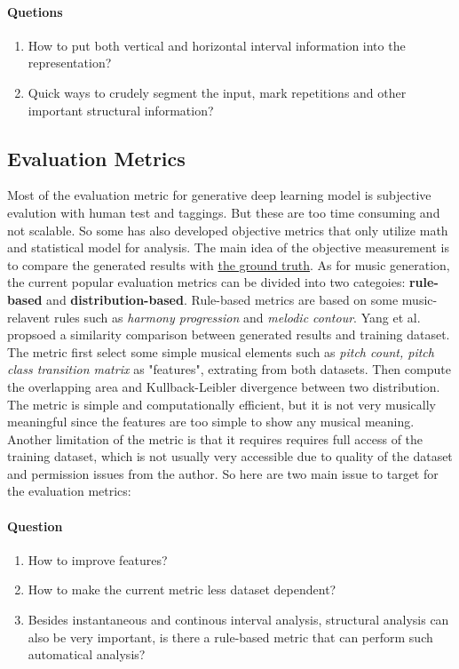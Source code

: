 \documentclass[12pt]{report}
\begin{document}
\paragraph*{Quetions}
\begin{enumerate}
    \item How to put both vertical and horizontal interval information into 
    the representation?
    \item Quick ways to crudely segment the input, mark repetitions and other
    important structural information?
\end{enumerate}
\subsection*{Evaluation Metrics}
Most of the evaluation metric for generative deep learning model is 
subjective evalution with human test and taggings. But these are too
time consuming and not scalable. So some has also developed objective 
metrics that only utilize math and statistical model for analysis.
The main idea of the objective measurement is to compare
the generated results with \href{https://towardsdatascience.com/how-to-evaluate-text-generation-models-metrics-for-automatic-evaluation-of-nlp-models-e1c251b04ec1}
{the ground truth}. As for music generation, the current popular evaluation metrics 
can be divided into two categoies\cite{survey}: \textbf{rule-based} 
and \textbf{distribution-based}. Rule-based metrics are based on
some music-relavent rules such as \textit{harmony progression} and
\textit{melodic contour}. Yang et al.\cite{yang} propsoed a 
similarity comparison between generated results and training dataset.
The metric first select some simple musical elements such as \textit{pitch count, pitch 
class transition matrix} as "features", extrating from both datasets.
Then compute the overlapping area and Kullback-Leibler divergence between
two distribution. The metric is simple and computationally efficient, but
it is not very musically meaningful since the features are too simple to 
show any musical meaning. Another limitation of the metric is that it
requires requires full access of the training dataset, which is not usually
very accessible due to quality of the dataset and permission issues from the
author. So here are two main issue to target for the evaluation metrics:

\paragraph*{Question}
\begin{enumerate}
    \item How to improve features?
    \item How to make the current metric less dataset dependent?
    \item Besides instantaneous and continous interval analysis,
    structural analysis can also be very important, is there a 
    rule-based metric that can perform such automatical analysis?
\end{enumerate}






\end{document}
